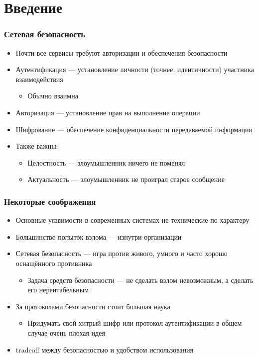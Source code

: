 \documentclass{../../slides-style}
\begin{document}
    \begin{frame}[plain]
        \titlepage
    \end{frame}

    \section{Введение}

    \begin{frame}
        \frametitle{Сетевая безопасность}
        \begin{itemize}
            \item Почти все сервисы требуют авторизации и обеспечения безопасности
            \item Аутентификация --- установление личности (точнее, идентичности) участника взаимодействия
            \begin{itemize}
                \item Обычно взаимна
            \end{itemize}
            \item Авторизация --- установление прав на выполнение операции
            \item Шифрование --- обеспечение конфиденциальности передаваемой информации
            \item Также важны:
            \begin{itemize}
                \item Целостность --- злоумышленник ничего не поменял
                \item Актуальность --- злоумышленник не проиграл старое сообщение
            \end{itemize} 
        \end{itemize}
    \end{frame}

    \begin{frame}
        \frametitle{Некоторые соображения}
        \begin{itemize}
            \item Основные уязвимости в современных системах не технические по характеру
            \item Большинство попыток взлома --- изнутри организации
            \item Сетевая безопасность --- игра против живого, умного и часто хорошо оснащённого противника
            \begin{itemize}
                \item Задача средств безопасности --- не сделать взлом невозможным, а сделать его нерентабельным
            \end{itemize}
            \item За протоколами безопасности стоит большая наука
            \begin{itemize}
                \item Придумать свой хитрый шифр или протокол аутентификации в общем случае очень плохая идея
            \end{itemize} 
            \item tradeoff между безопасностью и удобством использования
        \end{itemize}
    \end{frame}
\end{document}
